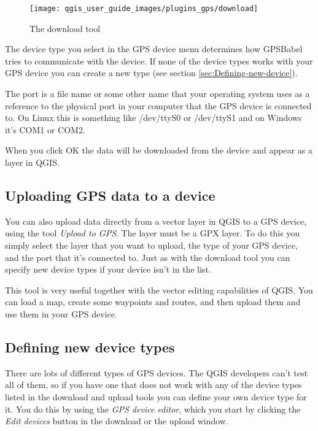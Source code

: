 %
\begin{figure}

\caption{\label{figure_download}The download tool}

\texttt{[image: qgis\_user\_guide\_images/plugins\_gps/download]}
\end{figure}


The device type you select in the GPS device menu determines how GPSBabel
tries to communicate with the device. If none of the device types
works with your GPS device you can create a new type (see section
\ref{sec:Defining-new-device}).

The port is a file name or some other name that your operating system
uses as a reference to the physical port in your computer that the
GPS device is connected to. On Linux this is something like /dev/ttyS0
or /dev/ttyS1 and on Windows it's COM1 or COM2.

When you click OK the data will be downloaded from the device and
appear as a layer in QGIS.


\subsection{Uploading GPS data to a device}

You can also upload data directly from a vector layer in QGIS to a
GPS device, using the tool \emph{Upload to GPS}. The layer must be
a GPX layer. To do this you simply select the layer that you want
to upload, the type of your GPS device, and the port that it's connected
to. Just as with the download tool you can specify new device types
if your device isn't in the list.

This tool is very useful together with the vector editing capabilities
of QGIS. You can load a map, create some waypoints and routes, and
then upload them and use them in your GPS device.


\subsection{\label{sec:Defining-new-device}Defining new device types}

There are lots of different types of GPS devices. The QGIS developers
can't test all of them, so if you have one that does not work with
any of the device types listed in the download and upload tools you
can define your own device type for it. You do this by using the \emph{GPS
device editor}, which you start by clicking the \emph{Edit devices}
button in the download or the upload window.

